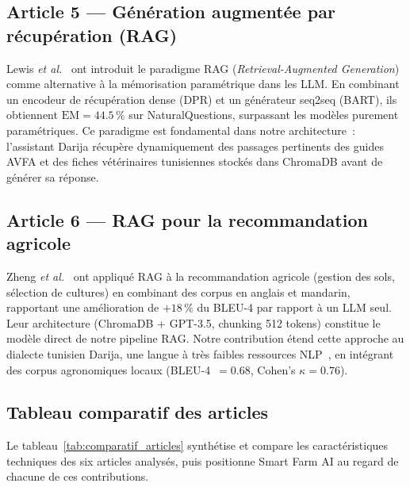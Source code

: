 \subsection*{Article 5 --- Génération augmentée par récupération (RAG)}

Lewis \textit{et al.}~\cite{lewis2020rag} ont introduit le paradigme RAG
(\textit{Retrieval-Augmented Generation}) comme alternative à la mémorisation
paramétrique dans les LLM. En combinant un encodeur de récupération dense (DPR)
et un générateur seq2seq (BART), ils obtiennent $\text{EM} = 44.5\,\%$
sur NaturalQuestions, surpassant les modèles purement paramétriques.
Ce paradigme est fondamental dans notre architecture~: l'assistant Darija
récupère dynamiquement des passages pertinents des guides AVFA et des fiches
vétérinaires tunisiennes stockés dans ChromaDB avant de générer sa réponse.

\subsection*{Article 6 --- RAG pour la recommandation agricole}

Zheng \textit{et al.}~\cite{zheng2024rag_agri} ont appliqué RAG à la recommandation
agricole (gestion des sols, sélection de cultures) en combinant des corpus en anglais
et mandarin, rapportant une amélioration de $+18\,\%$ du BLEU-4 par rapport à un
LLM seul. Leur architecture (ChromaDB + GPT-3.5, chunking 512 tokens) constitue
le modèle direct de notre pipeline RAG.
Notre contribution étend cette approche au dialecte tunisien Darija, une langue
à très faibles ressources NLP~\cite{abbou2024arabic}, en intégrant des corpus
agronomiques locaux (BLEU-4~$= 0.68$, Cohen's $\kappa = 0.76$).

\subsection{Tableau comparatif des articles}

Le tableau~\ref{tab:comparatif_articles} synthétise et compare les caractéristiques
techniques des six articles analysés, puis positionne Smart Farm AI au regard de
chacune de ces contributions.

